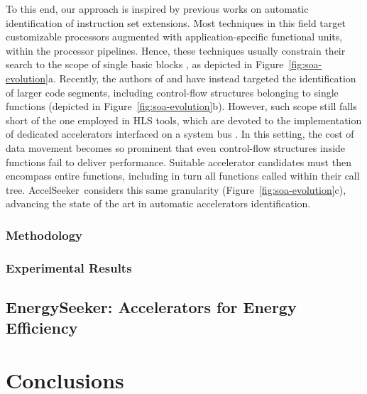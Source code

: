 \documentclass[]{usiinfthesis}
\newcommand{\aseeker}{{AccelSeeker}}
\begin{document}
To this end, our approach is inspired by previous works on automatic
identification of instruction set extensions. Most techniques in this
field target customizable processors augmented with
application-specific functional units, within the processor pipelines.
Hence, these techniques usually constrain their search to the scope of
single basic blocks \cite{PozziJul06} \cite{GiaquintaMar15}, as
depicted in Figure~\ref{fig:soa-evolution}a.  Recently, the authors of
\cite{ZacharopoulosApr19} and \cite{OppermannJul16} have instead
targeted the identification of larger code segments, including
control-flow structures belonging to single functions (depicted in
Figure~\ref{fig:soa-evolution}b).  However, such scope still falls
short of the one employed in HLS tools, which are devoted to the
implementation of dedicated accelerators interfaced on a system bus
\cite{CotaJun15}. In this setting, the cost of data movement becomes
so prominent that even control-flow structures inside functions fail
to deliver performance. Suitable accelerator candidates must then
encompass entire functions, including in turn all functions called
within their call tree. \aseeker\ considers this same granularity
(Figure~\ref{fig:soa-evolution}c), advancing the state of the art in
automatic accelerators identification.

\subsection{Methodology}

\subsection{Experimental Results}

\section{EnergySeeker: Accelerators for Energy Efficiency}


\chapter*{Conclusions}


\backmatter


%

%
%


%
%
%
\end{document}
